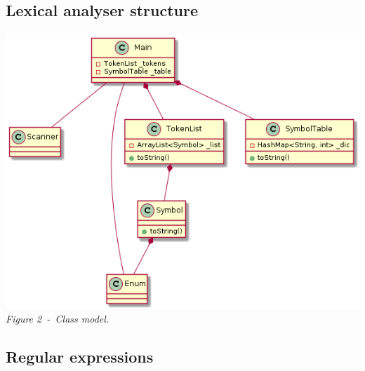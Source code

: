 \documentclass[a4paper,11pt]{article}
\begin{document}
  \subsection{Lexical analyser structure}
    \begin{center}
      \includegraphics[scale=0.4]{./img/class_diag.png}\\
      \textit{Figure 2~-~Class model.}
    \end{center}
  
  \subsection{Regular expressions}
\end{document}
